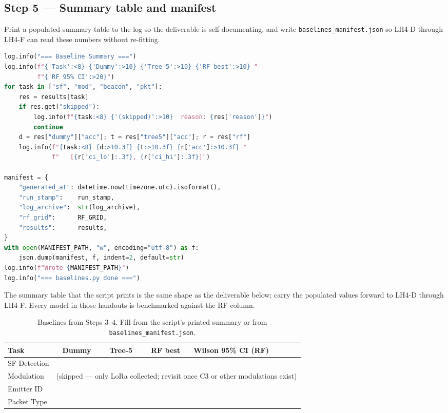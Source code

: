 \documentclass[11pt,letterpaper]{article}
\begin{document}
\subsection{Step 5 --- Summary table and manifest}
Print a populated summary table to the log so the deliverable is self-documenting, and write \texttt{baselines\_manifest.json} so LH4-D through LH4-F can read these numbers without re-fitting.

\begin{lstlisting}[language=Python]
log.info("=== Baseline Summary ===")
log.info(f"{'Task':<8} {'Dummy':>10} {'Tree-5':>10} {'RF best':>10} "
         f"{'RF 95% CI':>20}")
for task in ["sf", "mod", "beacon", "pkt"]:
    res = results[task]
    if res.get("skipped"):
        log.info(f"{task:<8} {'(skipped)':>10}  reason: {res['reason']}")
        continue
    d = res["dummy"]["acc"]; t = res["tree5"]["acc"]; r = res["rf"]
    log.info(f"{task:<8} {d:>10.3f} {t:>10.3f} {r['acc']:>10.3f} "
             f"   [{r['ci_lo']:.3f}, {r['ci_hi']:.3f}]")

manifest = {
    "generated_at": datetime.now(timezone.utc).isoformat(),
    "run_stamp":    run_stamp,
    "log_archive":  str(log_archive),
    "rf_grid":      RF_GRID,
    "results":      results,
}
with open(MANIFEST_PATH, "w", encoding="utf-8") as f:
    json.dump(manifest, f, indent=2, default=str)
log.info(f"Wrote {MANIFEST_PATH}")
log.info("=== baselines.py done ===")
\end{lstlisting}

The summary table that the script prints is the same shape as the deliverable below; carry the populated values forward to LH4-D through LH4-F. Every model in those handouts is benchmarked against the RF column.

\begin{table}[h!]
	\centering
	\renewcommand{\arraystretch}{1.4}
	\begin{tabularx}{\textwidth}{l c c c X}
		\toprule
		\textbf{Task} & \textbf{Dummy} & \textbf{Tree-5} & \textbf{RF best} & \textbf{Wilson 95\% CI (RF)} \\
		\midrule
		SF Detection     & & & & \\
		Modulation       & \multicolumn{4}{l}{(skipped --- only LoRa collected; revisit once C3 or other modulations exist)} \\
		Emitter ID       & & & & \\
		Packet Type      & & & & \\
		\bottomrule
	\end{tabularx}
	\caption{Baselines from Steps 3--4. Fill from the script's printed summary or from \texttt{baselines\_manifest.json}.}
\end{table}
\end{document}
